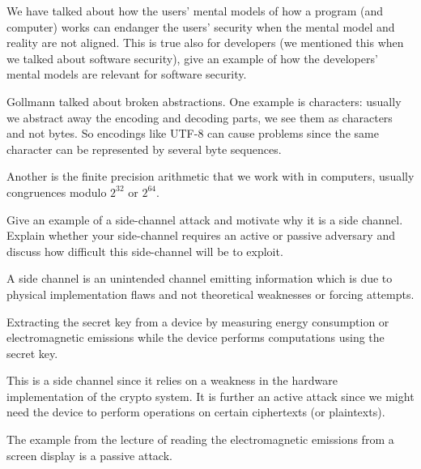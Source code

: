   
\question[3]\label{q:software}
We have talked about how the users' mental models of how a program (and 
computer) works can endanger the users' security when the mental model and 
reality are not aligned.
This is true also for developers (we mentioned this when we talked about 
software security), give an example of how the developers' mental models are 
relevant for software security.

\begin{solution}
  Gollmann talked about broken abstractions.
  One example is characters: usually we abstract away the encoding and decoding 
  parts, we see them as characters and not bytes.
  So encodings like UTF-8 can cause problems since the same character can be 
  represented by several byte sequences.

  Another is the finite precision arithmetic that we work with in computers, 
  usually congruences modulo \(2^{32}\) or \(2^{64}\).
\end{solution}


\question[3]
Give an example of a side-channel attack and motivate why it is a side channel.
Explain whether your side-channel requires an active or passive adversary and 
discuss how difficult this side-channel will be to exploit.

\begin{solution}
  A side channel is an unintended channel emitting information which is due 
  to physical implementation flaws and not theoretical weaknesses or forcing 
  attempts.

  Extracting the secret key from a device by measuring energy consumption or 
  electromagnetic emissions while the device performs computations using the 
  secret key.

  This is a side channel since it relies on a weakness in the hardware 
  implementation of the crypto system.
  It is further an active attack since we might need the device to perform 
  operations on certain ciphertexts (or plaintexts).

  The example from the lecture of reading the electromagnetic emissions from a 
  screen display is a passive attack.
\end{solution}


